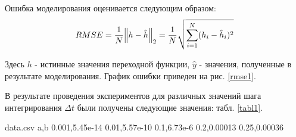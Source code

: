 	Ошибка моделирования оценивается следующим образом:
	\begin{equation}
		RMSE = \frac{1}{N} \norm{h - \hat{h}}_2 = \frac{1}{N}\sqrt{\sum_{i=1}^N (h_i - \hat{h}_i)^2}
	\end{equation}

	Здесь $h$ - истинные значения переходной функции, $\hat{y}$ - значения, полученные в результате моделирования. График ошибки приведен на рис. \ref{rmse1}.
	
	В результате проведения экспериментов для различных значений шага интегрирования $\Delta t$ были получены следующие значения: табл. \ref{tabl1}.
	
	\begin{filecontents*}{data.csv}
	a,b
	0.001,5.45e-14
	0.01,5.57e-10
	0.1,6.73e-6
	0.2,0.00013
	0.25,0.00036
	\end{filecontents*}

	\begin{center}
		\label{rmse1}	
	\end{center}
	
